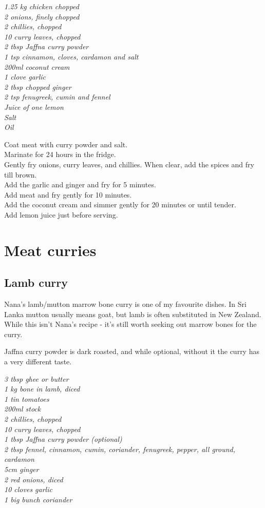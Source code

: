 \documentclass{tufte-book}
\begin{document}
\smallskip
\emph{1.25 kg chicken chopped
\\2 onions, finely chopped
\\2 chillies, chopped
\\10 curry leaves, chopped
\\2 tbsp Jaffna curry powder
\\1 tsp cinnamon, cloves, cardamon and salt
\\200ml coconut cream
\\1 clove garlic
\\2 tbsp chopped ginger
\\2 tsp fenugreek, cumin and fennel
\\Juice of one lemon
\\Salt
\\Oil}

\smallskip
Coat meat with curry powder and salt. 
\\Marinate for 24 hours in the fridge.
\\Gently fry onions, curry leaves, and chillies. When clear, add the spices and fry till brown.
\\Add the garlic and ginger and fry for 5 minutes.
\\Add meat and fry gently for 10 minutes.
\\Add the coconut cream and simmer gently for 20 minutes or until tender.
\\Add lemon juice just before serving.

\chapter{Meat curries}

\section{Lamb curry}

Nana's lamb/mutton marrow bone curry is one of my favourite dishes. In Sri Lanka mutton usually means goat, but lamb is often substituted in New Zealand. While this isn't Nana's recipe - it's still worth seeking out marrow bones for the curry.

Jaffna curry powder is dark roasted, and while optional, without it the curry has a very different taste.

\smallskip
\emph{3 tbsp ghee or butter
\\1 kg bone in lamb, diced
\\1 tin tomatoes
\\200ml stock
\\2 chillies, chopped
\\10 curry leaves, chopped
\\1 tbsp Jaffna curry powder (optional)
\\2 tbsp fennel, cinnamon, cumin, coriander, fenugreek, pepper, all ground, cardamon
\\5cm ginger
\\2 red onions, diced
\\10 cloves garlic
\\1 big bunch coriander}
\end{document}

